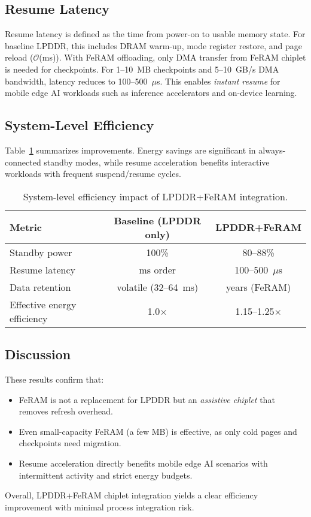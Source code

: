 \subsection{Resume Latency}
Resume latency is defined as the time from power-on to usable memory state. 
For baseline LPDDR, this includes DRAM warm-up, mode register restore, and page reload ($\mathcal{O}$(ms)).
With FeRAM offloading, only DMA transfer from FeRAM chiplet is needed for checkpoints. 
For 1--10~MB checkpoints and 5--10~GB/s DMA bandwidth, latency reduces to 100--500~$\mu$s.
This enables \emph{instant resume} for mobile edge AI workloads such as inference accelerators and on-device learning.

\subsection{System-Level Efficiency}
Table~\ref{tab:sys_efficiency} summarizes improvements. 
Energy savings are significant in always-connected standby modes, while resume acceleration benefits interactive workloads with frequent suspend/resume cycles.

\begin{table}[t]
  \centering
  \caption{System-level efficiency impact of LPDDR+FeRAM integration.}
  \label{tab:sys_efficiency}
  \vspace{3pt}
  \begin{tabular}{@{}lcc@{}}
    \toprule
    Metric & Baseline (LPDDR only) & LPDDR+FeRAM \\
    \midrule
    Standby power & 100\% & 80--88\% \\
    Resume latency & ms order & 100--500~$\mu$s \\
    Data retention & volatile (32--64~ms) & years (FeRAM) \\
    Effective energy efficiency & 1.0$\times$ & 1.15--1.25$\times$ \\
    \bottomrule
  \end{tabular}
\end{table}

\subsection{Discussion}
These results confirm that:
\begin{itemize}
  \item FeRAM is not a replacement for LPDDR but an \emph{assistive chiplet} that removes refresh overhead.
  \item Even small-capacity FeRAM (a few MB) is effective, as only cold pages and checkpoints need migration.
  \item Resume acceleration directly benefits mobile edge AI scenarios with intermittent activity and strict energy budgets.
\end{itemize}
Overall, LPDDR+FeRAM chiplet integration yields a clear efficiency improvement with minimal process integration risk.
